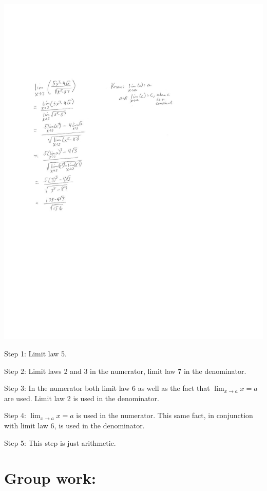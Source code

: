 \documentclass[nooutcomes]{ximera}
\begin{document}
	\begin{image}
	\includegraphics[trim= 150 440 300 185]{Figure2.pdf}
	\end{image}
\newpage
	\begin{freeResponse}
	Step 1:  Limit law 5.
		
	Step 2:  Limit laws 2 and 3 in the numerator, limit law 7 in the denominator.
		
	Step 3:  In the numerator both limit law 6 as well as the fact that $\lim_{x \to a}x = a$ are used.  Limit law 2 is used in the denominator.
		
	Step 4:  $\lim_{x \to a}x = a$ is used in the numerator.  This same fact, in conjunction with limit law 6, is used in the denominator.
		
	Step 5:  This step is just arithmetic.
	\end{freeResponse}
	
	

\section*{Group work:}
\end{document}
